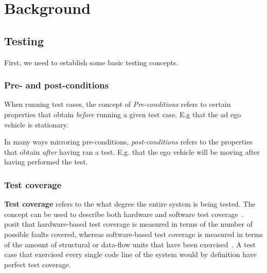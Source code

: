 \chapter{Background}

\section{Testing}

First, we need to establish some basic testing concepts.

\subsection{Pre- and post-conditions}\label{sec:testingConditions}

When running test cases, the concept of \textit{Pre-conditions}
refers to certain properties that
obtain \textit{before} running a given test case. E.g that the \acrshort{ad} ego vehicle is
stationary.

In many ways mirroring pre-conditions, \textit{post-conditions} refers to the properties that obtain
\textit{after} having ran a test. E.g. that the ego vehicle will be moving after having performed
the test.


\subsection{Test coverage}\label{sec:testCoverage}

\textbf{Test coverage} refers to the what degree the entire system is being tested. The concept can
be used to describe both hardware and software test
coverage~\cite[187]{testCoverage94}.~\citeauthor{testCoverage94} posit that hardware-based test
coverage is measured in terms of the number of possible faults covered, whereas software-based test
coverage is measured in terms of the amount of structural or data-flow units that have been
exercised~\cite[187]{testCoverage94}. A test case that exercised every single code line of the
system would by definition have perfect test coverage.


% 

